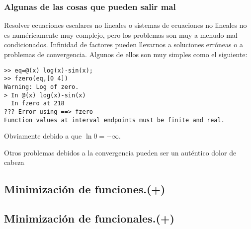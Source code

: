 \subsubsection{Algunas de las cosas que pueden salir mal}

Resolver ecuaciones escalares no lineales o sistemas de ecuaciones no
lineales no es numéricamente muy complejo, pero los problemas son muy
a menudo mal condicionados. Infinidad de factores pueden llevarnos a
soluciones erróneas o a problemas de convergencia. Algunos de ellos
son muy simples como el siguiente:

  \begin{verbatim}
>> eq=@(x) log(x)-sin(x);
>> fzero(eq,[0 4])
Warning: Log of zero.
> In @(x) log(x)-sin(x)
  In fzero at 218
??? Error using ==> fzero
Function values at interval endpoints must be finite and real.
\end{verbatim}
Obviamente debido a que $\ln0=-\infty$.

Otros problemas debidos a la convergencia pueden ser un auténtico
dolor de cabeza


\subsection{Minimización de funciones.(+)}


\subsection{Minimización de funcionales.(+)}
